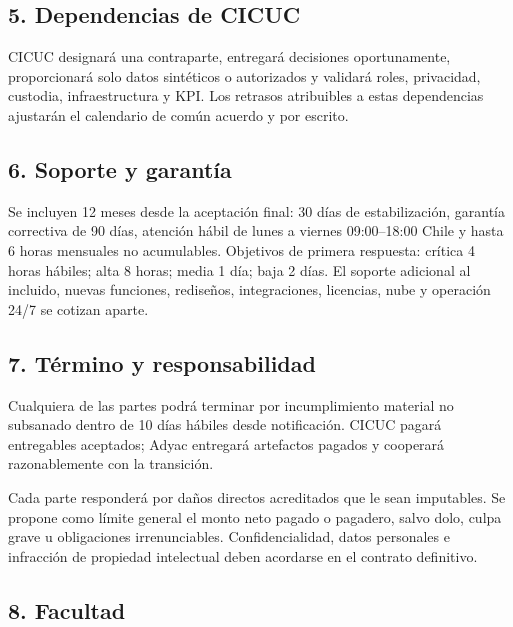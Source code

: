 \documentclass[
]{article}
\begin{document}
\hypertarget{5-dependencias-de-cicuc}{%
\subsection{5. Dependencias de CICUC}\label{5-dependencias-de-cicuc}}

CICUC designará una contraparte, entregará decisiones oportunamente,
proporcionará solo datos sintéticos o autorizados y validará roles,
privacidad, custodia, infraestructura y KPI. Los retrasos atribuibles a
estas dependencias ajustarán el calendario de común acuerdo y por
escrito.

\hypertarget{6-soporte-y-garantuxeda}{%
\subsection{6. Soporte y garantía}\label{6-soporte-y-garantuxeda}}

Se incluyen 12 meses desde la aceptación final: 30 días de
estabilización, garantía correctiva de 90 días, atención hábil de lunes
a viernes 09:00--18:00 Chile y hasta 6 horas mensuales no acumulables.
Objetivos de primera respuesta: crítica 4 horas hábiles; alta 8 horas;
media 1 día; baja 2 días. El soporte adicional al incluido, nuevas
funciones, rediseños, integraciones, licencias, nube y operación 24/7 se
cotizan aparte.

\hypertarget{7-tuxe9rmino-y-responsabilidad}{%
\subsection{7. Término y
responsabilidad}\label{7-tuxe9rmino-y-responsabilidad}}

Cualquiera de las partes podrá terminar por incumplimiento material no
subsanado dentro de 10 días hábiles desde notificación. CICUC pagará
entregables aceptados; Adyac entregará artefactos pagados y cooperará
razonablemente con la transición.

Cada parte responderá por daños directos acreditados que le sean
imputables. Se propone como límite general el monto neto pagado o
pagadero, salvo dolo, culpa grave u obligaciones irrenunciables.
Confidencialidad, datos personales e infracción de propiedad intelectual
deben acordarse en el contrato definitivo.

\hypertarget{8-facultad}{%
\subsection{8. Facultad}\label{8-facultad}}
\end{document}
